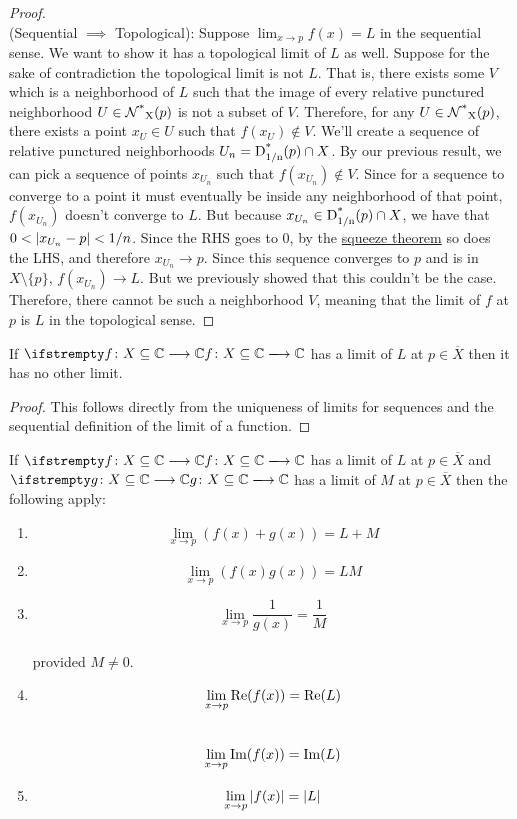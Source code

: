 \begin{proof}
\\(Sequential $\implies$ Topological): Suppose $\lim_{x \to p} f(x) = L$ in the sequential sense. We want to show it has a topological limit of $L$ as well. Suppose for the sake of contradiction the topological limit is not $L$. That is, there exists some $V$ which is a neighborhood of $L$ such that the image of every relative punctured neighborhood $U \in \rpnbhd{p}{X}$ is not a subset of $V$. Therefore, for any $U \in \rpnbhd{p}{X}$, there exists a point $x_U \in U$ such that $f(x_U) \not\in V$. We'll create a sequence of relative punctured neighborhoods $U_n = \pdisk{p}{1/n} \cap X$. By our previous result, we can pick a sequence of points $x_{U_n}$ such that $f(x_{U_n}) \not\in V$. Since for a sequence to converge to a point it must eventually be inside any neighborhood of that point, $f(x_{U_n})$ doesn't converge to $L$. But because $x_{U_n} \in \pdisk{p}{1/n} \cap X$, we have that $0 < \modulus{x_{U_n}-p} < 1/n$. Since the RHS goes to 0, by the \hyperlink{Squeeze Theorem}{squeeze theorem} so does the LHS, and therefore $x_{U_n} \to p$. Since this sequence converges to $p$ and is in $X\setminus\{p\}$, $f(x_{U_n}) \to L$. But we previously showed that this couldn't be the case. Therefore, there cannot be such a neighborhood $V$, meaning that the limit of $f$ at $p$ is $L$ in the topological sense. 
\end{proof}
\begin{theorem}
If $\fn{f}{X\subseteq\C}{\C}$ has a limit of $L$ at $p \in \overline{X}$ then it has no other limit.
\end{theorem}
\begin{proof}
This follows directly from the uniqueness of limits for sequences and the sequential definition of the limit of a function.
\end{proof}
\begin{theorem}
If $\fn{f}{X\subseteq\C}{\C}$ has a limit of $L$ at $p \in \overline{X}$ and $\fn{g}{X\subseteq\C}{\C}$ has a limit of $M$ at $p \in \overline{X}$ then the following apply:
\begin{enumerate}
\item $$\lim_{x \to p} (f(x)+g(x)) = L+M$$
\item $$\lim_{x \to p} (f(x)g(x)) = LM$$
\item $$\lim_{x \to p} \frac{1}{g(x)} = \frac{1}{M}$$\\
provided $M \neq 0$.
\item $$\lim_{x \to p} \rpart{f(x)} = \rpart{L}$$\\$$\lim_{x \to p} \ipart{f(x)} = \ipart{L}$$
\item $$\lim_{x \to p} \modulus{f(x)} = \modulus{L}$$
\end{enumerate}
\end{theorem}
